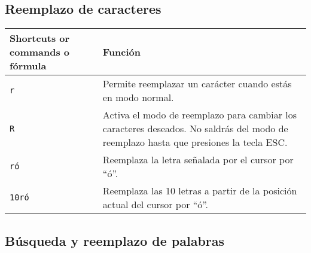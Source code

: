 \documentclass[
  doc,
  floatsintext,
  longtable,
  a4paper,
  nolmodern,
  notxfonts,
  notimes,
  colorlinks=true,linkcolor=blue,citecolor=blue,urlcolor=blue]{apa7}
\begin{document}
\subsection{Reemplazo de caracteres}\label{reemplazo-de-caracteres}

\begin{longtable}[]{@{}
  >{\raggedright\arraybackslash}p{}
  >{\raggedright\arraybackslash}p{}@{}}
\toprule\noalign{}
\begin{minipage}[b]{\linewidth}\raggedright
Shortcuts or commands o fórmula
\end{minipage} & \begin{minipage}[b]{\linewidth}\raggedright
Función
\end{minipage} \\
\midrule\noalign{}
\endhead
\bottomrule\noalign{}
\endlastfoot
\texttt{r} & Permite reemplazar un carácter cuando estás en modo
normal. \\
\texttt{R} & Activa el modo de reemplazo para cambiar los caracteres
deseados. No saldrás del modo de reemplazo hasta que presiones la tecla
ESC. \\
\texttt{ró} & Reemplaza la letra señalada por el cursor por ``ó''. \\
\texttt{10ró} & Reemplaza las 10 letras a partir de la posición actual
del cursor por ``ó''. \\
\end{longtable}

\subsection{Búsqueda y reemplazo de
palabras}\label{buxfasqueda-y-reemplazo-de-palabras}
\end{document}
